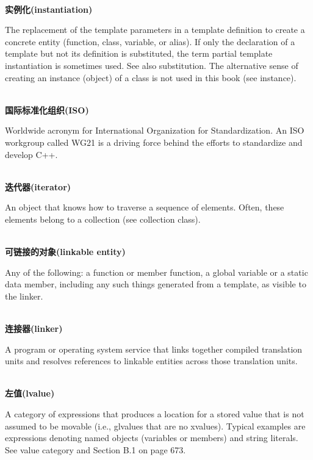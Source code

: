 \hspace*{\fill} \\ %
\noindent
\textbf{实例化(instantiation)}

The replacement of the template parameters in a template definition to create a concrete entity (function, class, variable, or alias). If only the declaration of a template but not its definition is substituted, the term partial template instantiation is sometimes used. See also substitution. The alternative sense of creating an instance (object) of a class is not used in this book (see instance).

\hspace*{\fill} \\ %
\noindent
\textbf{国际标准化组织(ISO)}

Worldwide acronym for International Organization for Standardization. An ISO workgroup called WG21 is a driving force behind the efforts to standardize and develop C++.

\hspace*{\fill} \\ %
\noindent
\textbf{迭代器(iterator)}

An object that knows how to traverse a sequence of elements. Often, these elements belong to a collection (see collection class).

\hspace*{\fill} \\ %
\noindent
\textbf{可链接的对象(linkable entity)}

Any of the following: a function or member function, a global variable or a static data member, including any such things generated from a template, as visible to the linker.

\hspace*{\fill} \\ %
\noindent
\textbf{连接器(linker)}

A program or operating system service that links together compiled translation units and resolves references to linkable entities across those translation units.

\hspace*{\fill} \\ %
\noindent
\textbf{左值(lvalue)}

A category of expressions that produces a location for a stored value that is not assumed to be movable (i.e., glvalues that are no xvalues). Typical examples are expressions denoting named objects (variables or members) and string literals. See value category and Section B.1 on page 673.


